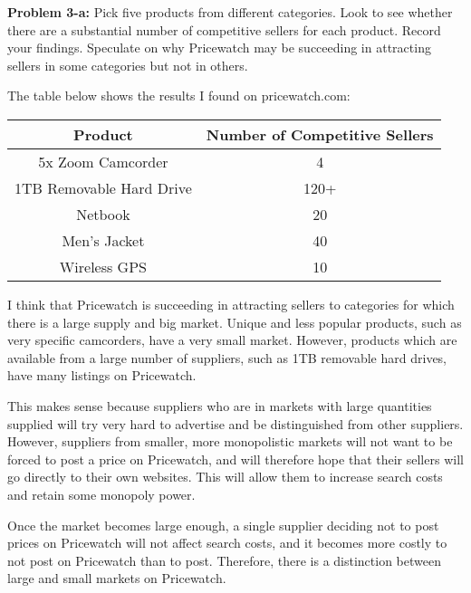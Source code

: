 \documentclass[psamsfonts]{amsart}
\newenvironment{sol}{\vspace{0.25cm}{\large \bfseries Solution:}}{\qedsymbol}
\newenvironment{prob}[1]{\begin{framed}{\large \bfseries Problem #1:}}{\end{framed}}
\begin{document}
\begin{prob}{3-a}
Pick five products from different categories.  Look to see whether there are a substantial number of competitive sellers for each product.  Record your findings.  Speculate on why Pricewatch may be succeeding in attracting sellers in some categories but not in others.
\end{prob}
\begin{sol}
The table below shows the results I found on pricewatch.com:
\begin{table}[h!]
\centering
\begin{tabular}{c | c}
Product & Number of Competitive Sellers \\
\hline \hline
5x Zoom Camcorder & 4 \\
1TB Removable Hard Drive & 120+ \\
Netbook & 20 \\
Men's Jacket & 40 \\
Wireless GPS & 10 
\end{tabular}
\end{table}

I think that Pricewatch is succeeding in attracting sellers to categories for which there is a large supply and big market. Unique and less popular products, such as very specific camcorders, have a very small market. However, products which are available from a large number of suppliers, such as 1TB removable hard drives, have many listings on Pricewatch. 

This makes sense because suppliers who are in markets with large quantities supplied will try very hard to advertise and be distinguished from other suppliers. However, suppliers from smaller, more monopolistic markets will not want to be forced to post a price on Pricewatch, and will therefore hope that their sellers will go directly to their own websites. This will allow them to increase search costs and retain some monopoly power. 

Once the market becomes large enough, a single supplier deciding not to post prices on Pricewatch will not affect search costs, and it becomes more costly to not post on Pricewatch than to post. Therefore, there is a distinction between large and small markets on Pricewatch.
\end{sol}
\end{document}
